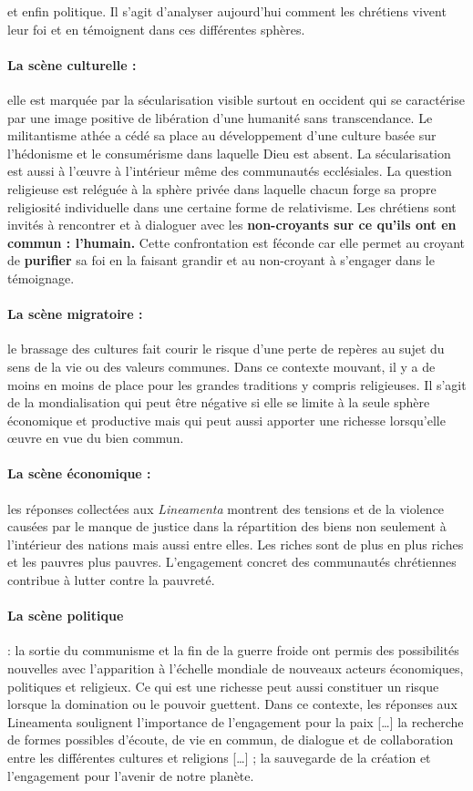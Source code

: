 et enfin politique. Il s’agit d’analyser aujourd’hui comment les chrétiens vivent leur foi et en
témoignent dans ces différentes sphères.
\paragraph{La scène culturelle :}
 elle est marquée par la sécularisation visible surtout en occident qui se
caractérise par une image positive de libération d’une humanité sans transcendance. Le militantisme
athée a cédé sa place au développement d’une culture basée sur l’hédonisme et le consumérisme dans
laquelle Dieu est absent. La sécularisation est aussi à l’œuvre à l’intérieur même des communautés
ecclésiales. La question religieuse est reléguée à la sphère privée dans laquelle chacun forge sa propre
religiosité individuelle dans une certaine forme de relativisme.
Les chrétiens sont invités à rencontrer et à dialoguer avec les \textbf{non-croyants sur ce qu’ils ont en
commun : l’humain.} Cette confrontation est féconde car elle permet au croyant de \textbf{purifier} sa foi en
la faisant grandir et au non-croyant à s’engager dans le témoignage.
\paragraph{La scène migratoire :}
 le brassage des cultures fait courir le risque d’une perte de repères au sujet du
sens de la vie ou des valeurs communes. Dans ce contexte mouvant, il y a de moins en moins de place
pour les grandes traditions y compris religieuses. Il s’agit de la mondialisation qui peut être négative
si elle se limite à la seule sphère économique et productive mais qui peut aussi apporter une richesse
lorsqu’elle œuvre en vue du bien commun.
\paragraph{La scène économique :}
 les réponses collectées aux \textit{Lineamenta} montrent des tensions et de la
violence causées par le manque de justice dans la répartition des biens non seulement à l’intérieur des
nations mais aussi entre elles. Les riches sont de plus en plus riches et les pauvres plus pauvres.
L’engagement concret des communautés chrétiennes contribue à lutter contre la pauvreté.
\paragraph{La scène politique }
: la sortie du communisme et la fin de la guerre froide ont permis des possibilités
nouvelles avec l’apparition à l’échelle mondiale de nouveaux acteurs économiques, politiques et
religieux. Ce qui est une richesse peut aussi constituer un risque lorsque la domination ou le pouvoir
guettent. Dans ce contexte, les réponses aux Lineamenta soulignent l’importance de l'engagement
pour la paix […] la recherche de formes possibles d'écoute, de vie en commun, de dialogue et de
collaboration entre les différentes cultures et religions […] ; la sauvegarde de la création et
l'engagement pour l'avenir de notre planète.
